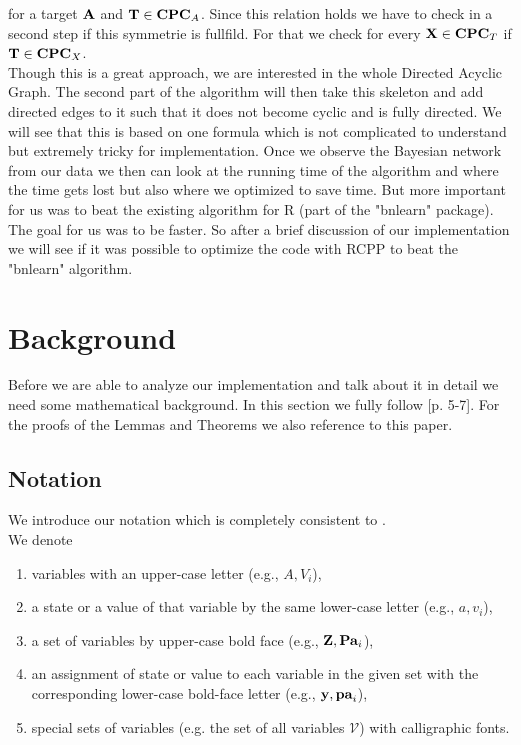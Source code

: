 for a target ${\textbf{A}}$ and ${\textbf{T}} \in {\textbf{CPC}}_{A}$. Since this relation holds we have to check in a second step if this symmetrie is fullfild. For that we check for every ${\textbf{X}} \in {\textbf{CPC}}_{T}$ if ${\textbf{T}} \in {\textbf{CPC}}_{X}$.\\
Though this is a great approach, we are interested in the whole Directed Acyclic Graph. The second part of the algorithm will then take this skeleton and add directed edges to it such that it does not become cyclic and is fully directed. We will see that this is based on one formula which is not complicated to understand but extremely tricky for implementation. Once we observe the Bayesian network from our data we then can look at the running time of the algorithm and where the time gets lost but also where we optimized to save time. But more important for us was to beat the existing algorithm for R (part of the "bnlearn" package). The goal for us was to be faster. So after a brief discussion of our implementation we will see if it was possible to optimize the code with RCPP to beat the "bnlearn" algorithm.

\chapter{Background}

Before we are able to analyze our implementation and talk about it in detail we need some mathematical background. In this section we fully follow \cite{TBA}[p. 5-7]. For the proofs of the Lemmas and Theorems we also reference to this paper.

	\section{Notation}

		We introduce our notation which is completely consistent to \cite{TBA}.\\
		We denote
		\begin{enumerate}
			\item variables with an upper-case letter (e.g., $A, V_{i}$),
			\item a state or a value of that variable by the same lower-case letter (e.g., $a, v_{i}$),
			\item a set of variables by upper-case bold face (e.g., ${\textbf{Z}}, {\textbf{Pa}}_{i}$),
			\item an assignment of state or value to each variable in the given set with the corresponding lower-case bold-face letter (e.g., ${\textbf{y}}, {\textbf{pa}}_{i}$),
			\item special sets of variables (e.g. the set of all variables $\mathcal{V}$) with calligraphic fonts.
		\end{enumerate}

